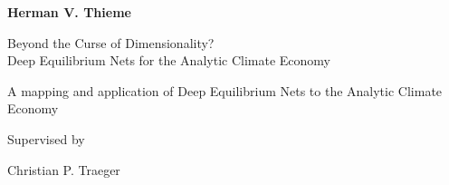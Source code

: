 \begin{titlepage}
\centering
\vspace*{1cm} %

{\Large\bfseries Herman V. Thieme\par}
\vspace{2cm} %

{\Huge Beyond the Curse of Dimensionality?\\Deep Equilibrium Nets for the Analytic Climate Economy\par}
\vspace{1.5cm} %

{\Large A mapping and application of Deep Equilibrium Nets to the Analytic Climate Economy \par}
\vspace{8cm} %

{\Large Supervised by\par}
{\Large Christian P. Traeger\par}

\vfill

\end{titlepage}
